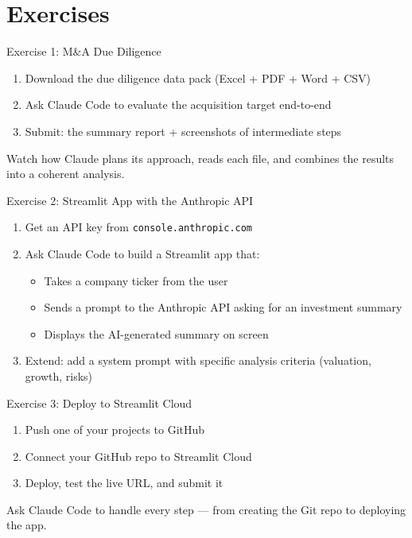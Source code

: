 \documentclass[aspectratio=169]{beamer}
\begin{document}
\section{Exercises}

\begin{frame}{Exercise 1: M\&A Due Diligence}
\begin{enumerate}
  \item Download the due diligence data pack (Excel + PDF + Word + CSV)
  \item Ask Claude Code to evaluate the acquisition target end-to-end
  \item Submit: the summary report + screenshots of intermediate steps
\end{enumerate}
\vspace{0.3cm}
Watch how Claude plans its approach, reads each file, and combines the results into a coherent analysis.
\end{frame}

\begin{frame}{Exercise 2: Streamlit App with the Anthropic API}
\begin{enumerate}
  \item Get an API key from \texttt{console.anthropic.com}
  \item Ask Claude Code to build a Streamlit app that:
  \begin{itemize}\small
    \item Takes a company ticker from the user
    \item Sends a prompt to the Anthropic API asking for an investment summary
    \item Displays the AI-generated summary on screen
  \end{itemize}
  \item Extend: add a system prompt with specific analysis criteria (valuation, growth, risks)
\end{enumerate}
\end{frame}

\begin{frame}{Exercise 3: Deploy to Streamlit Cloud}
\begin{enumerate}
  \item Push one of your projects to GitHub
  \item Connect your GitHub repo to Streamlit Cloud
  \item Deploy, test the live URL, and submit it
\end{enumerate}
\vspace{0.3cm}
\alert{Ask Claude Code to handle every step} --- from creating the Git repo to deploying the app.
\end{frame}
\end{document}
